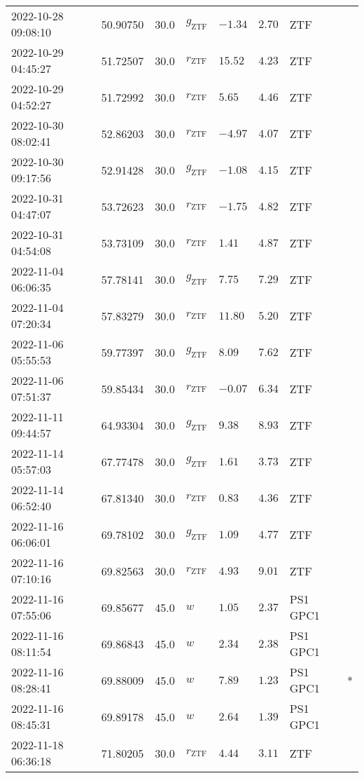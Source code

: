\documentclass{nature_plusfigure}
\begin{document}
\begin{supplement}
\begin{center}
\begin{longtable}{llllllll}
2022-10-28 09:08:10 & 50.90750 & 30.0 & ${g}_\mathrm{ZTF}$ & $-1.34$ & $2.70$ & ZTF &  \\ 
2022-10-29 04:45:27 & 51.72507 & 30.0 & ${r}_\mathrm{ZTF}$ & $15.52$ & $4.23$ & ZTF &  \\ 
2022-10-29 04:52:27 & 51.72992 & 30.0 & ${r}_\mathrm{ZTF}$ & $5.65$ & $4.46$ & ZTF &  \\ 
2022-10-30 08:02:41 & 52.86203 & 30.0 & ${r}_\mathrm{ZTF}$ & $-4.97$ & $4.07$ & ZTF &  \\ 
2022-10-30 09:17:56 & 52.91428 & 30.0 & ${g}_\mathrm{ZTF}$ & $-1.08$ & $4.15$ & ZTF &  \\ 
2022-10-31 04:47:07 & 53.72623 & 30.0 & ${r}_\mathrm{ZTF}$ & $-1.75$ & $4.82$ & ZTF &  \\ 
2022-10-31 04:54:08 & 53.73109 & 30.0 & ${r}_\mathrm{ZTF}$ & $1.41$ & $4.87$ & ZTF &  \\ 
2022-11-04 06:06:35 & 57.78141 & 30.0 & ${g}_\mathrm{ZTF}$ & $7.75$ & $7.29$ & ZTF &  \\ 
2022-11-04 07:20:34 & 57.83279 & 30.0 & ${r}_\mathrm{ZTF}$ & $11.80$ & $5.20$ & ZTF &  \\ 
2022-11-06 05:55:53 & 59.77397 & 30.0 & ${g}_\mathrm{ZTF}$ & $8.09$ & $7.62$ & ZTF &  \\ 
2022-11-06 07:51:37 & 59.85434 & 30.0 & ${r}_\mathrm{ZTF}$ & $-0.07$ & $6.34$ & ZTF &  \\ 
2022-11-11 09:44:57 & 64.93304 & 30.0 & ${g}_\mathrm{ZTF}$ & $9.38$ & $8.93$ & ZTF &  \\ 
2022-11-14 05:57:03 & 67.77478 & 30.0 & ${g}_\mathrm{ZTF}$ & $1.61$ & $3.73$ & ZTF &  \\ 
2022-11-14 06:52:40 & 67.81340 & 30.0 & ${r}_\mathrm{ZTF}$ & $0.83$ & $4.36$ & ZTF &  \\ 
2022-11-16 06:06:01 & 69.78102 & 30.0 & ${g}_\mathrm{ZTF}$ & $1.09$ & $4.77$ & ZTF &  \\ 
2022-11-16 07:10:16 & 69.82563 & 30.0 & ${r}_\mathrm{ZTF}$ & $4.93$ & $9.01$ & ZTF &  \\ 
2022-11-16 07:55:06 & 69.85677 & 45.0 & $w$ & $1.05$ & $2.37$ & PS1 GPC1 &  \\ 
2022-11-16 08:11:54 & 69.86843 & 45.0 & $w$ & $2.34$ & $2.38$ & PS1 GPC1 &  \\ 
2022-11-16 08:28:41 & 69.88009 & 45.0 & $w$ & $7.89$ & $1.23$ & PS1 GPC1 & * \\ 
2022-11-16 08:45:31 & 69.89178 & 45.0 & $w$ & $2.64$ & $1.39$ & PS1 GPC1 &  \\ 
2022-11-18 06:36:18 & 71.80205 & 30.0 & ${r}_\mathrm{ZTF}$ & $4.44$ & $3.11$ & ZTF &  \\ 

\end{longtable}
\end{center}
\end{supplement}
\end{document}
